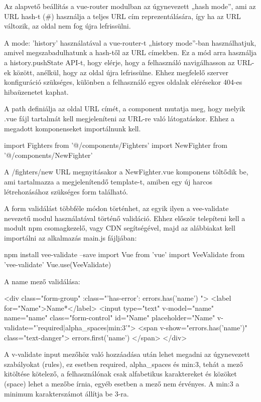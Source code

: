 Az alapvető beállítás a vue-router modulban az úgynevezett „hash mode”, ami az URL hash-t (\#) használja a teljes URL cím reprezentálására, így ha az URL változik, az oldal nem fog újra lefrissülni.

A mode: ’history’ használatával a vue-router-t „history mode”-ban használhatjuk, amivel megszabadulhatunk a hash-től az URL címekben. Ez a mód arra használja a history.pushState API-t, hogy elérje, hogy a felhasználó navigálhasson az URL-ek között, anélkül, hogy az oldal újra lefrissülne. Ehhez megfelelő szerver konfiguráció szükséges, különben a felhasználó egyes oldalak elérésekor 404-es hibaüzenetet kaphat.

A path definiálja az oldal URL címét, a component mutatja meg, hogy melyik .vue fájl tartalmát kell megjeleníteni az URL-re való látogatáskor. Ehhez a megadott komponenseket importálnunk kell.

\begin{cpp}
import Fighters from '@/components/Fighters'
import NewFighter from '@/components/NewFighter'
\end{cpp}

A /fighters/new URL megnyitásakor a NewFighter.vue komponens töltődik be, ami tartalmazza a megjelenítendő template-t, amiben egy új harcos létrehozásához szükséges form található.


A form validálást többféle módon történhet, az egyik ilyen a vee-validate nevezetű modul használatával történő validáció. Ehhez először telepíteni kell a modult npm csomagkezelő, vagy CDN segítségével, majd az alábbiakat kell importálni az alkalmazás main.js fájljában:

\begin{cpp}
npm install vee-validate --save
import Vue from 'vue'
import VeeValidate from 'vee-validate'
Vue.use(VeeValidate)
\end{cpp}

A name mező validálása:

\begin{cpp}
<div class="form-group" :class="{'has-error': errors.has('name') }">
<label for="Name">Name*</label>
<input type="text" v-model="name" name="name" class="form-control" 
   	id="Name" placeholder="Name" 
   	v-validate="'required|alpha_spaces|min:3'"> 
	<span v-show="errors.has('name')" class="text-danger">
	{{ errors.first('name') }}</span>
</div>
\end{cpp}

A v-validate input mezőhöz való hozzáadása után lehet megadni az úgynevezett szabályokat (rules), ez esetben required, alpha\_spaces és min:3, tehát a mező kitöltése kötelező, a felhasználónak csak alfabetikus karaktereket és közöket (space) lehet a mezőbe írnia, egyéb esetben a mező nem érvényes. A min:3 a minimum karakterszámot állítja be 3-ra.

